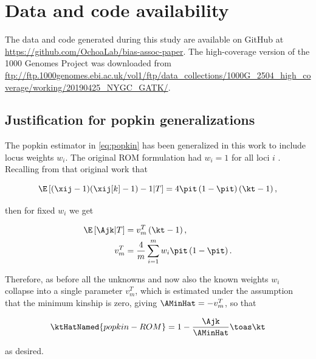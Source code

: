 \documentclass[11pt]{article}
\begin{document}
\begin{linenumbers}
\section*{Data and code availability}
The data and code generated during this study are available on GitHub at \url{https://github.com/OchoaLab/bias-assoc-paper}.
The high-coverage version of the 1000 Genomes Project was downloaded from \url{ftp://ftp.1000genomes.ebi.ac.uk/vol1/ftp/data_collections/1000G_2504_high_coverage/working/20190425_NYGC_GATK/}.


\printbibliography


\begin{appendices}
  \appendix

  \appendixpage
  
  \section{Justification for popkin generalizations}

  \label{sec:popkin_w_justif}

  The popkin estimator in \cref{eq:popkin} has been generalized in this work to include locus weights $w_i$.
  The original ROM formulation had $w_i=1$ for all loci $i$ \citep{ochoa_estimating_2021}.
  Recalling from that original work that
  \begin{linenomath*}
  $$
  \E \left[ (\xij-1)(\xij[k]-1) - 1 \middle| T \right]
  =
  4 \pit \left( 1 - \pit \right) \left( \kt - 1 \right),
  $$
  \end{linenomath*}
  then for fixed $w_i$ we get
  \begin{linenomath*}
  \begin{align*}
    \E \left[ \Ajk \middle| T \right]
    &=
      v_m^T \left( \kt - 1 \right)
      , \\
    v_m^T
    &=
      \frac{4}{m} \sum_{i=1}^m w_i \pit \left( 1 - \pit \right)
      .
  \end{align*}
  \end{linenomath*}
  Therefore, as before all the unknowns \pit and now also the known weights $w_i$ collapse into a single parameter $v_m^T$, which is estimated under the assumption that the minimum kinship is zero, giving $\AMinHat = -v_m^T$, so that
  \begin{linenomath*}
  $$
  \ktHatNamed{popkin-ROM}
  =
  1 - \frac{\Ajk}{\AMinHat}
  \toas
  \kt
  $$
  \end{linenomath*}
  as desired.


\end{appendices}
\end{linenumbers}
\end{document}
